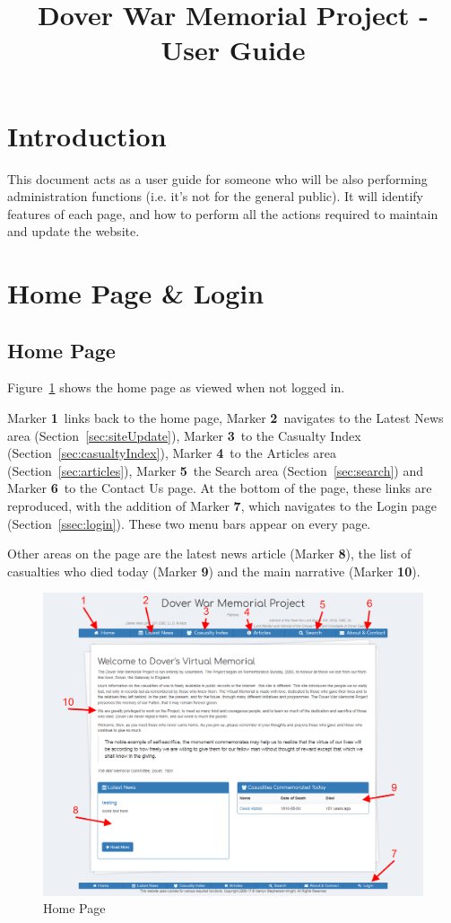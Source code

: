 \documentclass[12pt]{article}
\title{\textbf{Dover War Memorial Project - User Guide}}
\date{}
\author{}
\newcommand{\marker}[1]{Marker \color{red}\textbf{#1}\color{black}}
\begin{document}
\maketitle

\tableofcontents

\section{Introduction}

This document acts as a user guide for someone who will be also performing administration functions (i.e. it's not for the general public). It will identify features of each page, and how to perform all the actions required to maintain and update the website.

\section{Home Page \& Login}

\subsection{Home Page}
Figure~\ref{fig:home} shows the home page as viewed when not logged in.

\marker{1}\ links back to the home page, \marker{2}\ navigates to the Latest News area (Section~\ref{sec:siteUpdate}), \marker{3}\ to the Casualty Index (Section~\ref{sec:casualtyIndex}), \marker{4}\ to the Articles area (Section~\ref{sec:articles}), \marker{5}\ the Search area (Section~\ref{sec:search}) and \marker{6}\ to the Contact Us page. At the bottom of the page, these links are reproduced, with the addition of \marker{7}, which navigates to the Login page (Section~\ref{ssec:login}). These two menu bars appear on every page.

Other areas on the page are the latest news article (\marker{8}), the list of casualties who died today (\marker{9}) and the main narrative (\marker{10}).

\begin{figure}[h]
  \centering
 \includegraphics[width=\textwidth]{pics/home.png}
	\caption{Home Page}\label{fig:home}
\end{figure}
\end{document}

